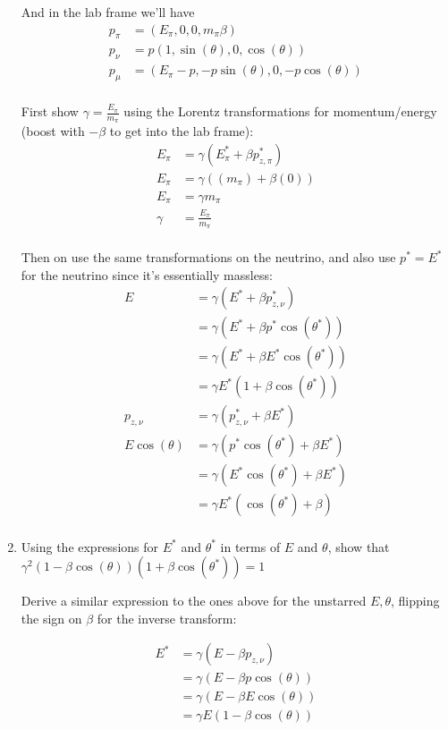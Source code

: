 \begin{enumerate}[label=\textbf{\alph*}.]
    And in the lab frame we'll have
    \begin{align*}
        p_\pi &= (E_\pi, 0, 0, m_\pi\beta) \\
        p_\nu &= p(1, \sin(\theta), 0, \cos(\theta)) \\
        p_\mu &= (E_\pi-p, -p\sin(\theta), 0, -p\cos(\theta)) \\
    \end{align*}

    First show $\gamma = \frac{E_\pi}{m_\pi}$ using the Lorentz transformations for momentum/energy (boost with $-\beta$ to get into the lab frame):
    \begin{align*}
        E_\pi &= \gamma(E_\pi^* + \beta p_{z,\pi}^*) \\
        E_\pi &= \gamma((m_\pi) + \beta (0)) \\
        E_\pi &= \gamma m_\pi \\
        \gamma &= \frac{E_\pi}{m_\pi}\\
    \end{align*}

    Then on use the same transformations on the neutrino, and also use $p^* = E^*$ for the neutrino since it's essentially massless:
    \begin{align*}
        E &= \gamma(E^* + \beta p_{z,\nu}^*) \\
        &= \gamma(E^* + \beta p^*\cos(\theta^*)) \\
        &= \gamma(E^* + \beta E^*\cos(\theta^*)) \\
        &= \gamma E^*(1 + \beta \cos(\theta^*)) \\
        p_{z,\nu} &= \gamma(p_{z,\nu}^* + \beta E^*) \\
        E\cos(\theta) &= \gamma(p^*\cos(\theta^*) + \beta E^*) \\
        &= \gamma(E^*\cos(\theta^*) + \beta E^*) \\
        &= \gamma E^*(\cos(\theta^*) + \beta) \\
    \end{align*}
    
    \item Using the expressions for $E^*$ and $\theta^*$ in terms of $E$ and $\theta$, show that $\gamma^2 (1 - \beta\cos(\theta))(1 + \beta\cos(\theta^*)) = 1$

    Derive a similar expression to the ones above for the unstarred $E, \theta$, flipping the sign on $\beta$ for the inverse transform:

    \begin{align*}
        E^* &= \gamma(E - \beta p_{z,\nu}) \\
        &= \gamma(E - \beta p\cos(\theta)) \\
        &= \gamma(E - \beta E\cos(\theta)) \\
        &= \gamma E(1 - \beta \cos(\theta)) \\
    \end{align*}


\end{enumerate}
